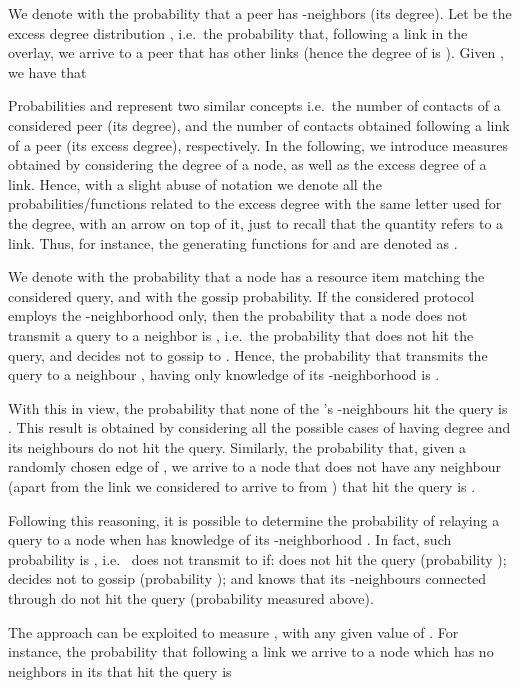 \documentclass{sig-alternate}
\begin{document}
We denote with  the probability that a peer has  -neighbors (its degree).
Let  be the excess degree distribution \cite{newmanHandbook}, i.e.~the probability that, following a link in the overlay, we arrive to a peer  that has other  links (hence the degree of  is ). Given , we have that


Probabilities  and  represent two similar concepts i.e.~the number of contacts of a considered peer (its degree), and the number of contacts obtained following a link of a peer (its excess degree), respectively. In the following, we introduce measures obtained by considering the degree  of a node, as well as the excess degree  of a link. Hence, with a slight abuse of notation we denote all the probabilities/functions related to the excess degree with the same letter used for the degree, with an arrow on top of it, just to recall that the quantity refers to a link.
Thus, for instance, the generating functions for  and  are denoted as .

We denote with  the probability that a node has a resource item matching the considered query, and with  the gossip probability.
If the considered protocol employs the -neighborhood  only, then the probability that a node  does not transmit a query to a neighbor  is , i.e.~the probability that  does not hit the query, and  decides not to gossip to . Hence, the probability  that  transmits the query to a neighbour , having only knowledge of its -neighborhood  is .

With this in view, the probability that none of the 's -neighbours hit the query is . This result is obtained by considering all the possible cases of  having degree  and its  neighbours do not hit the query. Similarly, the probability that, given a randomly chosen edge of , we arrive to a node  that does not have any neighbour (apart from the link we considered to arrive to  from ) that hit the query is . 

Following this reasoning, it is possible to determine the probability  of relaying a query to a node  when  has knowledge of its -neighborhood . In fact, such probability is 
, i.e.~ does not transmit to  if:  does not hit the query (probability );  decides not to gossip  (probability ); and  knows that its -neighbours connected through  do not hit the query (probability  measured above).

The approach can be exploited to measure , with any given value of . For instance, the probability that following a link we arrive to a node which has no neighbors in its  that hit the query is 
 
\end{document}
